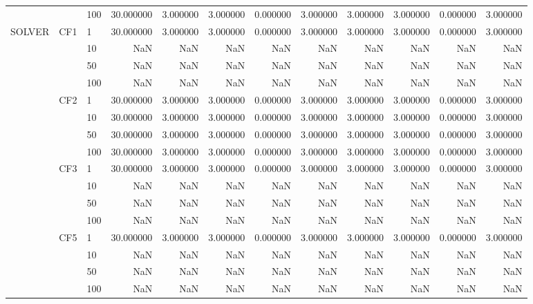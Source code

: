 \begin{tabular}{lllrrrrrrrrr}
 &  & 100 & 30.000000 & 3.000000 & 3.000000 & 0.000000 & 3.000000 & 3.000000 & 3.000000 & 0.000000 & 3.000000 \\
\cline{1-12} \cline{2-12}
\multirow[t]{16}{*}{SOLVER} & \multirow[t]{4}{*}{CF1} & 1 & 30.000000 & 3.000000 & 3.000000 & 0.000000 & 3.000000 & 3.000000 & 3.000000 & 0.000000 & 3.000000 \\
 &  & 10 & NaN & NaN & NaN & NaN & NaN & NaN & NaN & NaN & NaN \\
 &  & 50 & NaN & NaN & NaN & NaN & NaN & NaN & NaN & NaN & NaN \\
 &  & 100 & NaN & NaN & NaN & NaN & NaN & NaN & NaN & NaN & NaN \\
\cline{2-12}
 & \multirow[t]{4}{*}{CF2} & 1 & 30.000000 & 3.000000 & 3.000000 & 0.000000 & 3.000000 & 3.000000 & 3.000000 & 0.000000 & 3.000000 \\
 &  & 10 & 30.000000 & 3.000000 & 3.000000 & 0.000000 & 3.000000 & 3.000000 & 3.000000 & 0.000000 & 3.000000 \\
 &  & 50 & 30.000000 & 3.000000 & 3.000000 & 0.000000 & 3.000000 & 3.000000 & 3.000000 & 0.000000 & 3.000000 \\
 &  & 100 & 30.000000 & 3.000000 & 3.000000 & 0.000000 & 3.000000 & 3.000000 & 3.000000 & 0.000000 & 3.000000 \\
\cline{2-12}
 & \multirow[t]{4}{*}{CF3} & 1 & 30.000000 & 3.000000 & 3.000000 & 0.000000 & 3.000000 & 3.000000 & 3.000000 & 0.000000 & 3.000000 \\
 &  & 10 & NaN & NaN & NaN & NaN & NaN & NaN & NaN & NaN & NaN \\
 &  & 50 & NaN & NaN & NaN & NaN & NaN & NaN & NaN & NaN & NaN \\
 &  & 100 & NaN & NaN & NaN & NaN & NaN & NaN & NaN & NaN & NaN \\
\cline{2-12}
 & \multirow[t]{4}{*}{CF5} & 1 & 30.000000 & 3.000000 & 3.000000 & 0.000000 & 3.000000 & 3.000000 & 3.000000 & 0.000000 & 3.000000 \\
 &  & 10 & NaN & NaN & NaN & NaN & NaN & NaN & NaN & NaN & NaN \\
 &  & 50 & NaN & NaN & NaN & NaN & NaN & NaN & NaN & NaN & NaN \\
 &  & 100 & NaN & NaN & NaN & NaN & NaN & NaN & NaN & NaN & NaN \\
\cline{1-12} \cline{2-12}
\bottomrule
\end{tabular}
